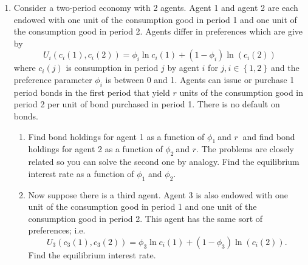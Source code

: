 \documentclass{article}
\begin{document}
\begin{enumerate}
\begin{enumerate}
\item An economist has taken Econ 905 and recognizes that the competitive
equilibrium is inefficient. She proposes to subsidize the return to savings
so that the representative agent receives a return of $r\left( 1+\varsigma
\right) $ per unit of capital rented to the firm rather than $r$ where $r$
is the rental price of capital paid by the firm and $\varsigma r$ is the
subsidy paid by the government per unit of capital. This subsidy is to be
funded with a lump tax, $\tilde{\tau}$, in the second period on the
representative agent (no taxes while young). While the agent takes $\tilde{%
\tau}$ as given, this is proportional to output in equilibrium so in
equilibrium $\tilde{\tau}=\tau y.$ What is the optimal extent of this
policy? That is, how should the government set $\tau $ and $\varsigma \ $if
it wishes to maximize the utility of the representative agent?
\end{enumerate}

\item Consider a two-period economy with 2 agents. Agent 1 and agent 2 are
each endowed with one unit of the consumption good in period 1 and one unit
of the consumption good in period 2. Agents differ in preferences which are
give by%
\begin{equation*}
U_{i}\left( c_{i}\left( 1\right) ,c_{i}\left( 2\right) \right) =\phi _{i}\ln
c_{i}\left( 1\right) +\left( 1-\phi _{i}\right) \ln \left( c_{i}\left(
2\right) \right)
\end{equation*}%
where $c_{i}\left( j\right) $ is consumption in period $j$ by agent $i$ for $%
j,i\in \left\{ 1,2\right\} \ $and the preference parameter $\phi _{i}$ is
between 0 and 1. Agents can issue or purchase 1 period bonds in the first
period that yield $r$ units of the consumption good in period 2 per unit of
bond purchased in period 1. There is no default on bonds.

\begin{enumerate}
\item Find bond holdings for agent 1 as a function of $\phi _{1}\ $and $r\ $%
and find bond holdings for agent 2 as a function of $\phi _{2}\ $and $r.$
The problems are closely related so you can solve the second one by analogy.
Find the equilibrium interest rate as a function of $\phi _{1}$ and $\phi
_{2}.$

\item Now suppose there is a third agent. Agent 3 is also endowed with one
unit of the consumption good in period 1 and one unit of the consumption
good in period 2. This agent has the same sort of preferences; i.e.%
\begin{equation*}
U_{3}\left( c_{3}\left( 1\right) ,c_{3}\left( 2\right) \right) =\phi _{3}\ln
c_{i}\left( 1\right) +\left( 1-\phi _{3}\right) \ln \left( c_{i}\left(
2\right) \right) .
\end{equation*}%
Find the equilibrium interest rate.


\end{enumerate}
\end{enumerate}
\end{document}
